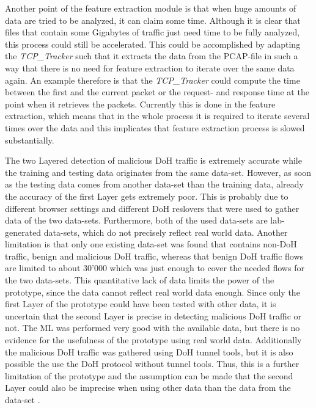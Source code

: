 Another point of the feature extraction module is that when huge amounts of data are tried to be analyzed, it can claim some time. Although it is clear that files that contain some Gigabytes of traffic just need time to be fully analyzed, this process could still be accelerated. This could be accomplished by adapting the \textit{TCP\_Tracker} such that it extracts the data from the PCAP-file in such a way that there is no need for feature extraction to iterate over the same data again. An example therefore is that the \textit{TCP\_Tracker} could compute the time between the first and the current packet or the request- and response time at the point when it retrieves the packets. Currently this is done in the feature extraction, which means that in the whole process it is required to iterate several times over the data and this implicates that feature extraction process is slowed substantially.

The two Layered detection of malicious DoH traffic is extremely accurate while the training and testing data originates from the same data-set. However, as soon as the testing data comes from another data-set than the training data, already the accuracy of the first Layer gets extremely poor. This is probably due to different browser settings and different DoH reslovers that were used to gather data of the two data-sets. Furthermore, both of the used data-sets are lab-generated data-sets, which do not precisely reflect real world data. Another limitation is that only one existing data-set was found that contains non-DoH traffic, benign and malicious DoH traffic, whereas that benign DoH traffic flows are limited to about 30'000 which was just enough to cover the needed flows for the two data-sets. This quantitative lack of data limits the power of the prototype, since the data cannot reflect real world data enough. Since only the first Layer of the prototype could have been tested with other data, it is uncertain that the second Layer is precise in detecting malicious DoH traffic or not. The ML was performed very good with the available data, but there is no evidence for the usefulness of the prototype using real world data. Additionally the malicious DoH traffic was gathered using DoH tunnel tools, but it is also possible the use the DoH protocol without tunnel tools. Thus, this is a further limitation of the prototype and the assumption can be made that the second Layer could also be imprecise when using other data than the data from the data-set \cite{CIRA-CIC-DoHBrw-2020}.

